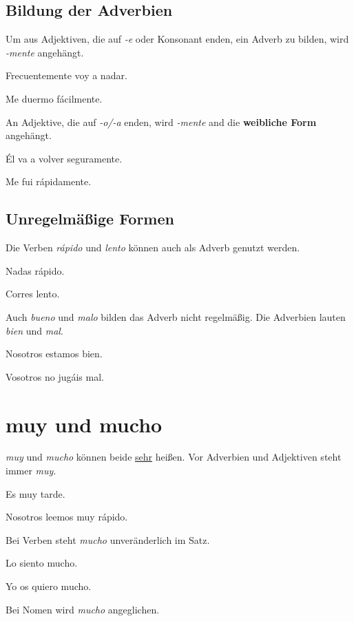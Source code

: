 \subsection*{Bildung der Adverbien}
Um aus Adjektiven, die auf \textit{-e} oder Konsonant enden,
ein Adverb zu bilden, wird \textit{-mente} angehängt.
\begin{ejemplos}
    \item Frecuentemente voy a nadar.
    \item Me duermo f\'acilmente.
\end{ejemplos}
An Adjektive, die auf \textit{-o/-a} enden, wird \textit{-mente}
and die \textbf{weibliche Form} angehängt.
\begin{ejemplos}
    \item \'El va a volver seguramente.
    \item Me fui r\'apidamente.
\end{ejemplos}
\subsection*{Unregelmäßige Formen}
Die Verben \textit{r\'apido} und \textit{lento} können auch als Adverb
genutzt werden.
\begin{ejemplos}
    \item Nadas r\'apido.
    \item Corres lento.
\end{ejemplos}
Auch \textit{bueno} und \textit{malo} bilden das Adverb nicht
regelmäßig. Die Adverbien lauten \textit{bien} und \textit{mal}.
\begin{ejemplos}
    \item Nosotros estamos bien.
    \item Vosotros no jug\'ais mal.
\end{ejemplos}
\section{muy und mucho}
\textit{muy} und \textit{mucho} können beide \underline{sehr} 
heißen. Vor Adverbien und Adjektiven steht immer \textit{muy}.
\begin{ejemplos}
    \item Es muy tarde.
    \item Nosotros leemos muy r\'apido.
\end{ejemplos}
Bei Verben steht \textit{mucho} unveränderlich im Satz.
\begin{ejemplos}
    \item Lo siento mucho.
    \item Yo os quiero mucho.
\end{ejemplos}
Bei Nomen wird \textit{mucho} angeglichen.
